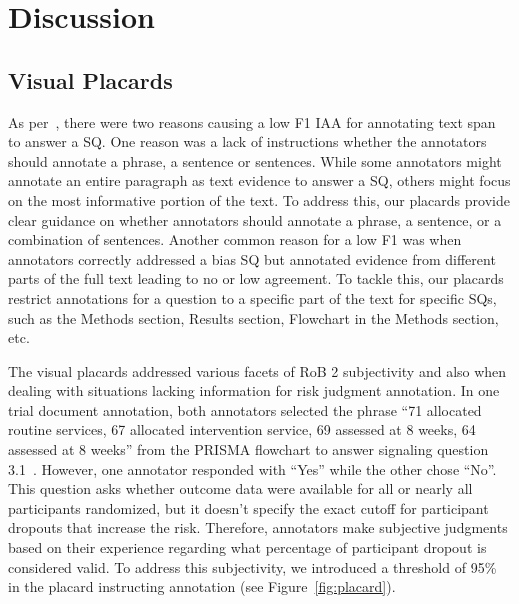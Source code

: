\documentclass[sn-mathphys,Numbered]{sn-jnl}%
\theoremstyle{thmstyleone}%
\theoremstyle{thmstyletwo}%
\theoremstyle{thmstylethree}%
\begin{document}
\section{Discussion}
\label{sec:discussion}
%
\subsection{Visual Placards}
\label{disc:placards}
%
As per~\cite{dhrangadhariya2023first}, there were two reasons causing a low F1 IAA for annotating text span to answer a SQ.
One reason was a lack of instructions whether the annotators should annotate a phrase, a sentence or sentences.
While some annotators might annotate an entire paragraph as text evidence to answer a SQ, others might focus on the most informative portion of the text.
To address this, our placards provide clear guidance on whether annotators should annotate a phrase, a sentence, or a combination of sentences.
Another common reason for a low F1 was when annotators correctly addressed a bias SQ but annotated evidence from different parts of the full text leading to no or low agreement. 
To tackle this, our placards restrict annotations for a question to a specific part of the text for specific SQs, such as the Methods section, Results section, Flowchart in the Methods section, etc.



The visual placards addressed various facets of RoB 2 subjectivity and also when dealing with situations lacking information for risk judgment annotation.
In one trial document annotation, both annotators selected the phrase ``71 allocated routine services, 67 allocated intervention service, 69 assessed at 8 weeks, 64 assessed at 8 weeks'' from the PRISMA flowchart to answer signaling question 3.1~\cite{gilbertson2000domiciliary}.
However, one annotator responded with ``Yes'' while the other chose ``No''.
This question asks whether outcome data were available for all or nearly all participants randomized, but it doesn't specify the exact cutoff for participant dropouts that increase the risk.
Therefore, annotators make subjective judgments based on their experience regarding what percentage of participant dropout is considered valid.
To address this subjectivity, we introduced a threshold of 95\% in the placard instructing annotation (see Figure~\ref{fig:placard}).

%
%
%
\end{document}
